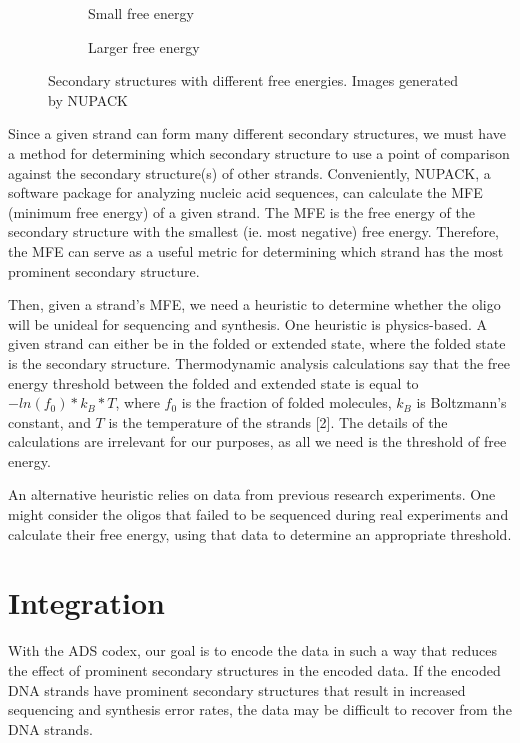 \documentclass{article}
\begin{document}
\begin{figure}[!h]
\centering
\begin{subfigure}{.5\textwidth}
  \centering
  
  \caption{Small free energy}
  \label{fig:sub1}
\end{subfigure}%
\begin{subfigure}{.5\textwidth}
  \centering
  
  \caption{Larger free energy}
  \label{fig:sub2}
\end{subfigure}
\caption{Secondary structures with different free energies. Images generated by NUPACK}
\label{fig:test}
\end{figure}

Since a given strand can form many different secondary structures, we must have a method for determining which secondary structure to use a point of comparison against the secondary structure(s) of other strands. Conveniently, NUPACK, a software package for analyzing nucleic acid sequences, can calculate the MFE (minimum free energy) of a given strand. The MFE is the free energy of the secondary structure with the smallest (ie. most negative) free energy. Therefore, the MFE can serve as a useful metric for determining which strand has the most prominent secondary structure.

Then, given a strand's MFE, we need a heuristic to determine whether the oligo will be unideal for sequencing and synthesis. One heuristic is physics-based. A given strand can either be in the folded or extended state, where the folded state is the secondary structure. Thermodynamic analysis calculations say that the free energy threshold between the folded and extended state is equal to $-ln(f_0) * k_B * T$, where $f_0$ is the fraction of folded molecules, $k_B$ is Boltzmann’s constant, and $T$ is the temperature of the strands [2]. The details of the calculations are irrelevant for our purposes, as all we need is the threshold of free energy.

An alternative heuristic relies on data from previous research experiments. One might consider the oligos that failed to be sequenced during real experiments and calculate their free energy, using that data to determine an appropriate threshold.

\section{Integration}

With the ADS codex, our goal is to encode the data in such a way that reduces the effect of prominent secondary structures in the encoded data. If the encoded DNA strands have prominent secondary structures that result in increased sequencing and synthesis error rates, the data may be difficult to recover from the DNA strands.
\end{document}
